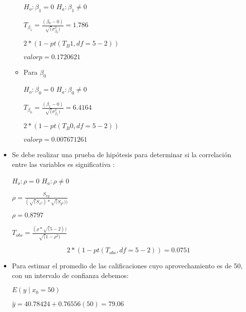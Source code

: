 \documentclass{../oxmathproblems}
\begin{document}
\begin{questions}
\begin{itemize}
\begin{itemize}
$ H_o:\beta_1 = 0 $  $ H_a:\beta_1 \neq 0 $ 



$ T_{\beta_1}= \frac{(\beta{_0}-0)}{\sqrt(\sigma^2_{\beta_0})} = 1.786 $ 


$ 2*(1-pt(T_B1, df = 5-2)) $ 

$ valor p = 0.1720621 $ 



\item Para $\beta_0$

$ H_o:\beta_0 = 0 $  $ H_a:\beta_0 \neq 0 $ 


$ T_{\beta_0}= \frac{(\beta_1 - 0)}{\sqrt(\sigma^2_{\beta_1})} = 6.4164 $



$ 2*(1-pt(T_B0, df = 5-2)) $ 

$ valor p = 0.007671261 $ 

\end{itemize} 
\item Se debe realizar una prueba de hipótesis para determinar si la correlación entre las variables es significativa : 


$ H_o:\rho = 0 $  $ H_a:\rho \neq 0 $ 


$ \rho = \frac{S_{xy}}{(\sqrt(S_{x^2})*\sqrt(S_{y^2}))} $

$ \rho = 0.8797 $ 


$ T_{obs} = \frac{(\rho*\sqrt(5-2))}{\sqrt(1-\rho^2)} $

$$2*(1-pt(T_{obs}, df = 5-2)) = 0.0751 $$



\item Para estimar el promedio de las calificaciones cuyo aprovechamiento es de 50, con un intervalo de confianza debemos: 

  $ E(y\mid x_0 = 50) $ 

$ \hat{y} = 40.78424 + 0.76556(50) = 79.06 $ 
\end{itemize} 


\end{questions}
\end{document}
